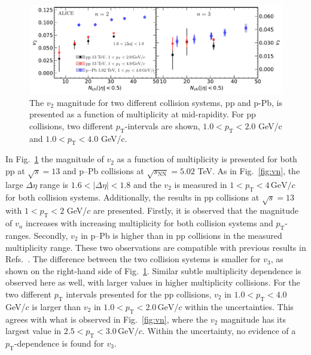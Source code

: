 \begin{figure}[h!]
	\centering
	\includegraphics[width=1.0\textwidth]{figures/Fig6_v2Mult_allSystems_Data.pdf} 
	\caption{The $v_2$ magnitude for two different collision systems, pp and p-Pb, is presented as a function of multiplicity at mid-rapidity. For pp collisions, two different $p_\mathrm{T}$-intervals are shown, $1.0<p_\mathrm{T}<2.0$ GeV/c and $1.0<p_\mathrm{T}<4.0$ GeV/c.} 
	\label{fig:v2mult}
\end{figure}

In Fig.~\ref{fig:v2mult} the magnitude of $v_2$ as a function of multiplicity is presented for both pp at $\sqrt{s}=13$ and p--Pb collisions at $\sqrt{s_\mathrm{NN}}=5.02$ TeV. As in Fig.~\ref{fig:vn}, the large $\Delta\eta$ range is $1.6<|\Delta\eta|<1.8$ and the $v_2$ is measured in $1<p_{\mathrm{T}}<4\,\mathrm{GeV}/c$ for both collision systems. Additionally, the results in pp collisions at $\sqrt{s}=13$ with $1<p_{\mathrm{T}}<2$ GeV/$c$ are presented. Firstly, it is observed that the magnitude of $v_n$ increases with increasing multiplicity for both collision systems and $p_\mathrm{T}$-ranges. Secondly, $v_2$ in p--Pb is higher than in pp collisions in the measured multiplicity range. These two observations are compatible with previous results in Refs.~\cite{ATLAS:2015hzw,ATLAS:2016yzd, Khachatryan:2015lva}. The difference between the two collision systems is smaller for $v_3$, as shown on the right-hand side of Fig.~\ref{fig:v2mult}. Similar subtle multiplicity dependence is observed here as well, with larger values in higher multiplicity collisions.
For the two different $p_\mathrm{T}$ intervals presented for the pp collisions, $v_2$ in $1.0<p_\mathrm{T}<4.0$ GeV/$c$ is larger than $v_2$ in $1.0<p_\mathrm{T}<2.0\,\mathrm{GeV}/c$ within the uncertainties. %
This agrees with what is observed in Fig.~\ref{fig:vn}, where the $v_2$ magnitude has its largest value in $2.5<p_\mathrm{T}<3.0\,\mathrm{GeV}/c$. Within the uncertainty, no evidence of a $p_\mathrm{T}$-dependence is found for $v_3$.


